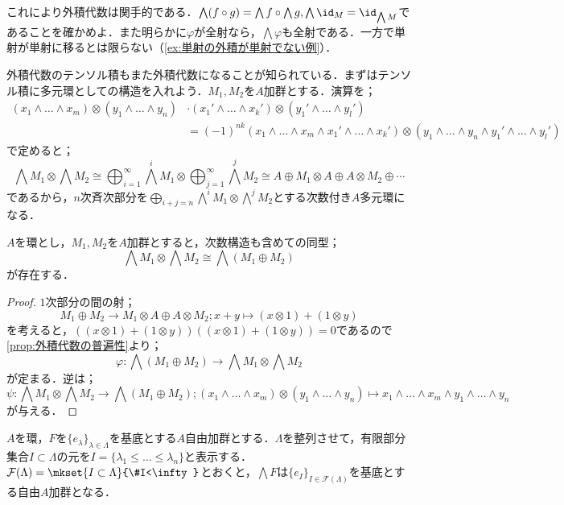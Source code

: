 これにより外積代数は関手的である．$\bigwedge(f\circ g)=\bigwedge f\circ \bigwedge g,\bigwedge\id_M=\id_{\bigwedge M}$であることを確かめよ．また明らかに$\varphi$が全射なら，$\bigwedge\varphi$も全射である．一方で単射が単射に移るとは限らない（\ref{ex:単射の外積が単射でない例}）．

外積代数のテンソル積もまた外積代数になることが知られている．まずはテンソル積に多元環としての構造を入れよう．$M_1,M_2$を$A$加群とする．演算を；
\[\begin{aligned}(x_1\wedge\dots\wedge x_m)\otimes(y_1\wedge\dots\wedge y_n)&\cdot(x_1'\wedge\dots\wedge x_k')\otimes(y_1'\wedge\dots\wedge y_l')\\
&=(-1)^{nk}(x_1\wedge\dots\wedge x_m\wedge x_1'\wedge\dots \wedge x_k')\otimes(y_1\wedge\dots\wedge y_n\wedge y_1'\wedge\dots \wedge y_l')
\end{aligned}\]
で定めると；
\[\bigwedge M_1\otimes \bigwedge M_2\cong \bigoplus_{i=1}^\infty\bigwedge^i M_1\otimes \bigoplus_{j=1}^\infty\bigwedge^j M_2\cong A\oplus M_1\otimes A\oplus A\otimes M_2\oplus\cdots\]
であるから，$n$次斉次部分を$\bigoplus_{i+j=n}\bigwedge^i M_1\otimes\bigwedge^j M_2$とする次数付き$A$多元環になる．

\begin{prop}\label{prop:外積代数のテンソルと直和}
	$A$を環とし，$M_1,M_2$を$A$加群とすると，次数構造も含めての同型；
	\[\bigwedge M_1\otimes\bigwedge M_2\cong \bigwedge (M_1\oplus M_2)\]
	が存在する．
\end{prop}

\begin{proof}
	$1$次部分の間の射；
	\[M_1\oplus M_2\to M_1\otimes A\oplus A\otimes M_2;x+y\mapsto (x\otimes 1)+(1\otimes y)\]
	を考えると，$((x\otimes 1)+(1\otimes y))((x\otimes 1)+(1\otimes y))=0$であるので\ref{prop:外積代数の普遍性}より；
	\[\varphi:\bigwedge (M_1\oplus M_2)\to\bigwedge M_1\otimes\bigwedge M_2\]
	が定まる．逆は；
	\[\psi:\bigwedge M_1\otimes\bigwedge M_2\to\bigwedge(M_1\oplus M_2);(x_1\wedge\dots\wedge x_m)\otimes(y_1\wedge\dots\wedge y_n)\mapsto x_1\wedge\dots\wedge x_m\wedge y_1\wedge\dots\wedge y_n\]
	が与える．
\end{proof}

\begin{prop}
	$A$を環，$F$を$\{e_\lambda\}_{\lambda\in\Lambda}$を基底とする$A$自由加群とする．$\Lambda$を整列させて，有限部分集合$I\subset\Lambda$の元を$I=\{\lambda_1\leq\dots\leq\lambda_n\}$と表示する．$\mathcal{F}(\Lambda)=\mkset{I\subset\Lambda}{\#I<\infty}$とおくと，$\bigwedge F$は$\{e_I\}_{I\in\mathcal{F}(\Lambda)}$を基底とする自由$A$加群となる．
\end{prop}

